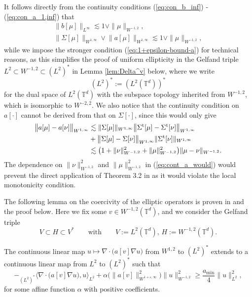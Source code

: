 \begin{rem}\label{rem:reality_check} It follows directly from the continuity conditions (\ref{eq:con_b_inf}) - (\ref{eq:con_a_1,inf}) that 
\begin{align}
\big\|b[\mu] \big\|_{L^{\infty}} \lesssim 1 \vee \|\mu\|_{W^{-1,2}},\label{eq:bound_b_1,inf}\\
\big\|\Sigma[\mu] \big\|_{W^{1,\infty}} \vee 
\big\|a[\mu] \big\|_{W^{1,\infty}} \lesssim 1 \vee \|\mu\|_{W^{-1,2}},\label{eq:bound_a_Sigma_1,inf}
\end{align}
while we impose the stronger condition (\ref{eq:1+epsilon-bound-a}) for technical reasons, as this simplifies the proof of uniform ellipticity in the Gelfand triple $L^2\subset W^{-1,2}\subset (L^2)^*$ in Lemma \ref{lem:Delta^v} below, where we write
\[
   (L^2)^* := (L^2(\mathbb{T}^d))^* 
\]
for the dual space of $L^2(\mathbb{T}^d)$ with the subspace topology inherited from $W^{-1,2}$, which is isomorphic to $W^{-2,2}$. We also notice that the continuity condition on $a[\cdot]$ cannot be derived from that on $\Sigma[\cdot]$, since this would only give
\begin{equation}\label{eq:cont_a_would}
\begin{split}
\big\|a[\mu] - a[\nu]\big\|_{W^{1,\infty}} & \lesssim \|\Sigma[\mu]\|_{W^{1,\infty}}\big\|\Sigma^{\operatorname{t}}[\mu] - \Sigma^{\operatorname{t}}[\nu]\big\|_{W^{1,\infty}} \\
& + \big\|\Sigma[\mu] - \Sigma[\nu]\big\|_{W^{1,\infty}} \|\Sigma^{\operatorname{t}}[\nu]\|_{W^{1,\infty}}\\
&  \lesssim \big(1 + \|\nu\|^2_{W^{-1,2}}+  \|\mu\|^2_{W^{-1,2}}\big)\|\mu - \nu\|_{W^{-1,2}}.
\end{split}
\end{equation}
The dependence on $\|\nu\|^2_{W^{-1,2}}$ and $\|\mu\|^2_{W^{-1,2}}$ in (\ref{eq:cont_a_would}) would prevent the direct application of Theorem 3.2 in \cite{RSZ22} as it would violate the local monotonicity condition. 
\end{rem}

The following lemma on the coercivity of the elliptic operators is proven in \cite[Lemma A.1]{djurdjevac2025weak} and the proof below. Here we fix  some $v \in  W^{-1,2}(\mathbb{T}^d)$, and we consider the Gelfand triple 
\begin{equation}
   V \subset H \subset V^* \qquad \text{with} \qquad V := L^2(\mathbb{T}^d), \, H := W^{-1,2}(\mathbb{T}^d). 
\end{equation}
\begin{lem}\label{lem:Delta^v}
The continuous linear map $u \mapsto \nabla \cdot \big(a[v]\nabla u\big)$ from $W^{1,2}$ to $(L^2)^*$ extends to a continuous linear map from $L^2$ to $(L^2)^*$ such that
\begin{equation}\label{eq:unif_ell}
      -{}_{(L^2)^*}\big\langle \nabla \cdot \big(a[v]\nabla u\big),u\big\rangle_{L^2} + \alpha \big(\|a[v]\|^2_{W^{1+\varepsilon,\infty}}\big) \|u\|^2_{W^{-1,2}} \geq \frac{a_{\min}}{4} \|u\|^2_{L^2},
\end{equation}
for some affine function $\alpha$ with positive coefficients.
\end{lem}

